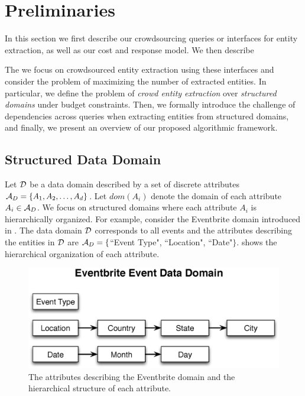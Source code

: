 
\section{Preliminaries}
\label{sec:prelims}
In this section we first describe our crowdsourcing queries or interfaces for entity extraction, as well as our cost and response model. We then describe 

The we focus on crowdsourced entity extraction using these interfaces and consider the problem of maximizing the number of extracted entities. In particular, we define the problem of {\em crowd entity extraction} over {\em structured domains} under budget constraints. Then, we formally introduce the challenge of dependencies across queries when extracting entities from structured domains, and finally, we present an overview of our proposed algorithmic framework. 


\subsection{Structured Data Domain}
\label{sec:data-domain}

Let $\mathcal{D}$ be a data domain described by a set of discrete attributes $\mathcal{A}_D = \{A_1, A_2, \dots, A_d\}$. Let $dom(A_i)$ denote the domain of each attribute $A_i  \in \mathcal{A}_D$. We focus on structured domains where each attribute $A_i$ is hierarchically organized. For example, consider the Eventbrite domain introduced in . The data domain $\mathcal{D}$ corresponds to all events and the attributes describing the entities in $\mathcal{D}$ are $\mathcal{A}_D = \{$``Event Type", ``Location", ``Date"$\}$.  shows the hierarchical organization of each attribute.

\begin{figure}[h]
	\begin{center}
	\includegraphics[clip,scale=0.4]{figs/eventsDomain.eps}
	\caption{The attributes describing the Eventbrite domain and the hierarchical structure of each attribute.}
	\label{fig:eventsdomain}
	\end{center}
	\vspace{-10pt}
\end{figure}


